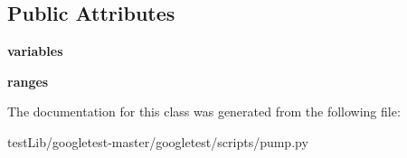 \subsection*{Public Attributes}
\begin{DoxyCompactItemize}
\item 
\mbox{\label{classpump_1_1Env_aba6456f3d0d23ac92bc9508c1b966bcd}} 
{\bfseries variables}
\item 
\mbox{\label{classpump_1_1Env_a8d5fec087c1a9108de9b105922b34309}} 
{\bfseries ranges}
\end{DoxyCompactItemize}


The documentation for this class was generated from the following file\+:\begin{DoxyCompactItemize}
\item 
test\+Lib/googletest-\/master/googletest/scripts/pump.\+py\end{DoxyCompactItemize}

